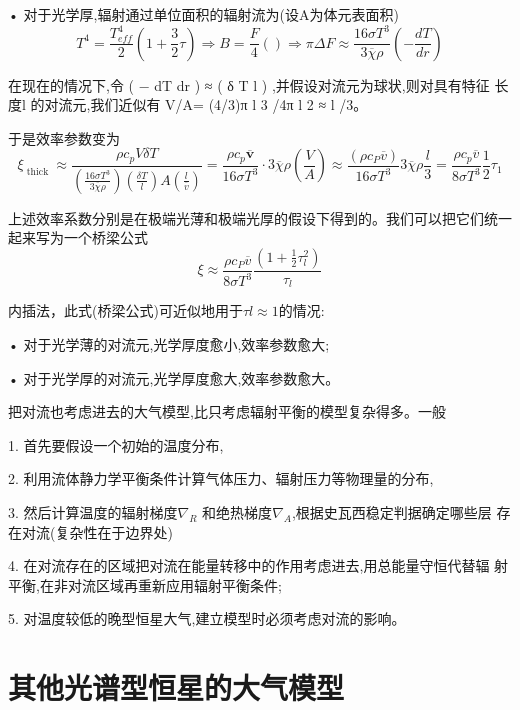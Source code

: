 \documentclass[UTF8]{article}
\begin{document}
\begin{fangsong}
• 对于光学厚,辐射通过单位面积的辐射流为(设A为体元表面积)
$$T^4=\frac{T_{eff}^4}{2}\left(1+\frac{3}{2}\tau\right)\Longrightarrow B=\frac{F}{4}()\Longrightarrow\pi \Delta F \approx \frac { 16 \sigma T ^ { 3 } } { 3 \overline { \chi } \rho } \left( - \frac { d T } { d r } \right)$$

在现在的情况下,令 ( − dT dr ) ≈ ( δ T l ) ,并假设对流元为球状,则对具有特征
长度l 的对流元,我们近似有 V/A= (4/3)π l 3 /4π l 2 ≈ l /3。

于是效率参数变为
$$\xi _ { \text { thick } } \approx \frac { \rho c _ { p } V \delta T } { \left( \frac { 16 \sigma T ^ { 3 } } { 3 \overline { \chi } \rho } \right) \left( \frac { \delta T } { l } \right) A \left( \frac { l } { \overline { v } } \right) } =\frac { \rho c _ { p } \overline { \mathbf { v } } } { 16 \sigma T ^ { 3 } } \cdot 3 \overline { \chi } \rho \left( \frac { V } { A } \right) \approx \frac { \left( \rho c _ { P } \overline { v } \right) } { 16 \sigma T ^ { 3 } } 3 \overline { \chi } \rho \frac { l } { 3 } = \frac { \rho c _ { p } \overline { v } } { 8 \sigma T ^ { 3 } } \frac { 1 } { 2 } \tau _ { 1 }$$

上述效率系数分别是在极端光薄和极端光厚的假设下得到的。我们可以把它们统一起来写为一个桥梁公式
$$\xi \approx \frac { \rho c _ { P } \overline { v } } { 8 \sigma T ^ { 3 } }\frac { \left( 1 + \frac { 1 } { 2 } \tau _ { l } ^ { 2 } \right) } { \tau _ { l } }$$

内插法，此式(桥梁公式)可近似地用于$\tau l\approx1$的情况:

• 对于光学薄的对流元,光学厚度愈小,效率参数愈大;

• 对于光学厚的对流元,光学厚度愈大,效率参数愈大。

把对流也考虑进去的大气模型,比只考虑辐射平衡的模型复杂得多。一般

1. 首先要假设一个初始的温度分布,

2. 利用流体静力学平衡条件计算气体压力、辐射压力等物理量的分布,

3. 然后计算温度的辐射梯度$\nabla_{ R }$ 和绝热梯度$\nabla_{ A }$,根据史瓦西稳定判据确定哪些层
存在对流(复杂性在于边界处)

4. 在对流存在的区域把对流在能量转移中的作用考虑进去,用总能量守恒代替辐
射平衡,在非对流区域再重新应用辐射平衡条件;

5. 对温度较低的晚型恒星大气,建立模型时必须考虑对流的影响。

\section{其他光谱型恒星的大气模型}

\end{fangsong}
\end{document}
